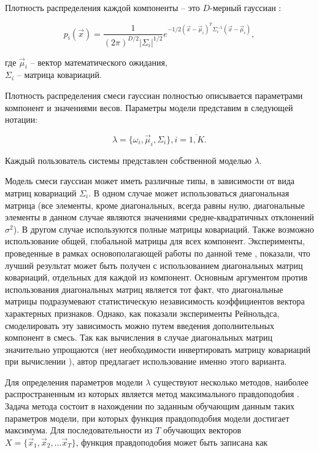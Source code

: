 Плотность распределения каждой компоненты -- это $D$-мерный гауссиан \cite{BMSTUM16}:

\begin{equation}
\label{eq:mdnormalpdf}
p_i(\vec x) = \frac{1}{(2\pi)^{D/2} |\Sigma_i|^{1/2}}e^{-1/2(\vec x - \vec \mu_i)^T \Sigma_i^{-1} (\vec x - \vec \mu_i)},
\end{equation}

\noindent где $\vec \mu_i$ -- вектор математического ожидания,\\
$\Sigma_i$ -- матрица ковариаций.

Плотность распределения смеси гауссиан полностью описывается параметрами компонент и значениями весов. Параметры модели представим в следующей нотации:

\begin{equation}
\lambda = \{ \omega_i, \vec \mu_i, \Sigma_i  \}, i = \overline{1,K}.
\end{equation}

Каждый пользователь системы представлен собственной моделью $\lambda$.

Модель смеси гауссиан может иметь различные типы, в зависимости от вида матриц ковариаций $\Sigma_i$. В одном случае может использоваться диагональная матрица (все элементы, кроме диагональных, всегда равны нулю, диагональные элементы в данном случае являются значениями средне-квадратичных отклонений $\sigma^2$). В другом случае используются полные матрицы ковариаций. Также возможно использование общей, глобальной матрицы для всех компонент. Эксперименты, проведенные в рамках основополагающей работы по данной теме \cite{Reynolds95gmm}, показали, что лучший результат может быть получен с использованием диагональных матриц ковариаций, отдельных для каждой из компонент. Основным аргументом против использования диагональных матриц является тот факт, что диагональные матрицы подразумевают статистическую независимость коэффициентов вектора характерных признаков. Однако, как показали эксперименты Рейнольдса, смоделировать эту зависимость можно путем введения дополнительных компонент в смесь. Так как вычисления в случае диагональных матриц значительно упрощаются (нет необходимости инвертировать матрицу ковариаций при вычислении ), автор предлагает использование именно этого варианта.

Для определения параметров модели $\lambda$ существуют несколько методов, наиболее распространенным из которых является метод максимального правдоподобия \cite{BMSTUM17}. Задача метода состоит в нахождении по заданным обучающим данным таких параметров модели, при которых функция правдоподобия модели достигает максимума. Для последовательности из $T$ обучающих векторов $X = \{ \vec x_1, \vec x_2, \ldots \vec x_T \}$, функция правдоподобия может быть записана как

